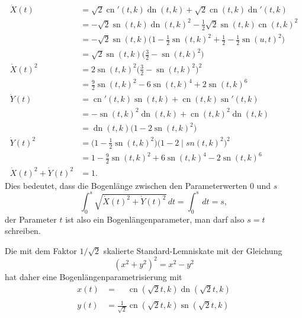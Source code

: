 \begin{align*}
\dot{X}(t)
&=
\sqrt{2}\operatorname{cn}'(t,k)\operatorname{dn}(t,k)
+
\sqrt{2}\operatorname{cn}(t,k)\operatorname{dn}'(t,k)
\\
&=
-\sqrt{2}\operatorname{sn}(t,k)\operatorname{dn}(t,k)^2
-\frac12\sqrt{2}\operatorname{sn}(t,k)\operatorname{cn}(t,k)^2
\\
&=
-\sqrt{2}\operatorname{sn}(t,k)\bigl(
1-{\textstyle\frac12}\operatorname{sn}(t,k)^2
+{\textstyle\frac12}-{\textstyle\frac12}\operatorname{sn}(u,t)^2
\bigr)
\\
&=
\sqrt{2}\operatorname{sn}(t,k)
\bigl(
{\textstyle \frac32}-\operatorname{sn}(t,k)^2
\bigr)
\\
\dot{X}(t)^2
&=
2\operatorname{sn}(t,k)^2
\bigl(
{\textstyle \frac32}-\operatorname{sn}(t,k)^2
\bigr)^2
\\
&=
{\textstyle\frac{9}{2}}\operatorname{sn}(t,k)^2
-
6\operatorname{sn}(t,k)^4
+2\operatorname{sn}(t,k)^6
\\
\dot{Y}(t)
&=
\operatorname{cn}'(t,k)\operatorname{sn}(t,k)
+
\operatorname{cn}(t,k)\operatorname{sn}'(t,k)
\\
&=
-\operatorname{sn}(t,k)^2
\operatorname{dn}(t,k)
+\operatorname{cn}(t,k)^2
\operatorname{dn}(t,k)
\\
&=
\operatorname{dn}(t,k)\bigl(1-2\operatorname{sn}(t,k)^2\bigr)
\\
\dot{Y}(t)^2
&=
\bigl(1-{\textstyle\frac12}\operatorname{sn}(t,k)^2\bigr)
\bigl(1-2\operatorname|{sn}(t,k)^2\bigr)^2
\\
&=
1-{\textstyle\frac{9}{2}}\operatorname{sn}(t,k)^2
+6\operatorname{sn}(t,k)^4
-2\operatorname{sn}(t,k)^6
\\
\dot{X}(t)^2 + \dot{Y}(t)^2
&=
1.
\end{align*}
Dies bedeutet, dass die Bogenlänge zwischen den Parameterwerten $0$ und $s$
\[
\int_0^s
\sqrt{\dot{X}(t)^2 + \dot{Y}(t)^2}
\,dt
=
\int_0^s\,dt
=
s,
\]
der Parameter $t$ ist also ein Bogenlängenparameter, man darf also
$s=t$ schreiben.

Die mit dem Faktor $1/\sqrt{2}$ skalierte Standard-Lemniskate mit der
Gleichung
\[
(x^2+y^2)^2 = x^2-y^2
\]
hat daher eine Bogenlängenparametrisierung mit
\begin{equation}
\begin{aligned}
x(t)
&=
\phantom{\frac{1}{\sqrt{2}}}
\operatorname{cn}(\sqrt{2}t,k)\operatorname{dn}(\sqrt{2}t,k)
\\
y(t)
&=
\frac{1}{\sqrt{2}}\operatorname{cn}(\sqrt{2}t,k)\operatorname{sn}(\sqrt{2}t,k)
\end{aligned}
\label{buch:elliptisch:lemniskate:bogenlaenge}
\end{equation}

